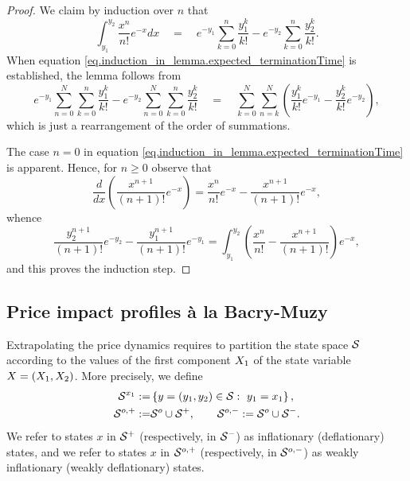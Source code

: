\documentclass[10pt]{article}
\begin{document}
\begin{proof}
 We claim by induction over $n$ that 
 \begin{equation}\label{eq.induction_in_lemma.expected_terminationTime}
   \int_{y_1}^{y_2}
   \frac{x^{n}}{n!}e^{-x}dx
   \quad
  =
   \quad 
  e^{-y_1} \sum_{k=0}^{n} \frac{y_{1}^{k}}{k!}  -  e^{-y_2}\sum_{k=0}^{n}\frac{y_{2}^{k}}{k!}.
 \end{equation}
When equation \eqref{eq.induction_in_lemma.expected_terminationTime} is established, the lemma follows from 
\begin{equation*}
  e^{-y_1} \sum_{n=0}^{N}\sum_{k=0}^{n} \frac{y_{1}^{k}}{k!}  -  e^{-y_2}\sum_{n=0}^{N}\sum_{k=0}^{n}\frac{y_{2}^{k}}{k!}
 \quad  = \quad 
 \sum_{k=0}^{N}\sum_{n=k}^{N} \left(\frac{y_{1}^{k}}{k!}e^{-y_1}  -  \frac{y_{2}^{k}}{k!}e^{-y_2}\right),
\end{equation*}
which is just a rearrangement of the order of summations.

The case $n=0$ in equation \eqref{eq.induction_in_lemma.expected_terminationTime} is apparent. Hence, for $n\geq0$ observe that
\begin{equation*}
 \frac{d}{dx} \left( \frac{x^{n+1}}{(n+1)!}e^{-x} \right)
 = 
 \frac{x^{n}}{n!}e^{-x}  -  \frac{x^{n+1}}{(n+1)!}e^{-x},
\end{equation*}
whence
\begin{equation*}
 \frac{y_{2}^{n+1}}{(n+1)!}e^{-y_{2}}  -  \frac{y_{1}^{n+1}}{(n+1)!}e^{-y_{1}}
 =
 \int_{y_{1}}^{y_{2}}
 \left(\frac{x^{n}}{n!}  -  \frac{x^{n+1}}{(n+1)!}\right)e^{-x},
\end{equation*}
and this proves the induction step.
\end{proof}






\subsection{Price impact profiles \`a la Bacry-Muzy}\label{sec.impact_a_la_BM}
Extrapolating the price dynamics requires to partition the state space $\mathcal{S}$ according to the values of the first component $X_1$ of the state variable $X= (X_1, X_2)$. More precisely, we define
\begin{equation}\label{eq.partition_of_state_space}
\begin{split}
 \mathcal{S}^{x_1} := & \left\lbrace y=(y_1,y_2) \in \mathcal{S}: \, \, y_1 = x_1\right\rbrace,
 \\
 \mathcal{S}^{o,+} := & \mathcal{S}^{o} \cup \mathcal{S}^{+},
 \qquad
 \mathcal{S}^{o,-} := \mathcal{S}^{o} \cup \mathcal{S}^{-}.
\end{split}
\end{equation}
We refer to states $x$ in $\mathcal{S}^{+}$ (respectively, in $\mathcal{S}^{-}$) as inflationary (deflationary) states, and we refer to states $x$ in $\mathcal{S}^{o,+}$ (respectively, in $\mathcal{S}^{o,-}$) as weakly inflationary (weakly deflationary) states.
\end{document}

